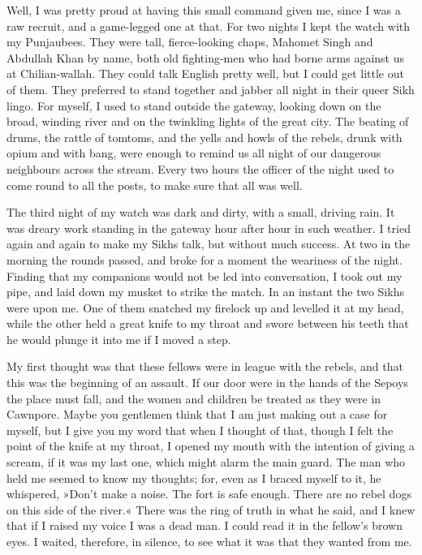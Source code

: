 Well, I was pretty proud at having this small command given me, since I was a raw recruit, and a game-legged one at that. For two nights I kept the watch with my Punjaubees. They were tall, fierce-looking chaps, Mahomet Singh and Abdullah Khan by name, both old fighting-men who had borne arms against us at Chilian-wallah. They could talk English pretty well, but I could get little out of them. They preferred to stand together and jabber all night in their queer Sikh lingo. For myself, I used to stand outside the gateway, looking down on the broad, winding river and on the twinkling lights of the great city. The beating of drums, the rattle of tomtoms, and the yells and howls of the rebels, drunk with opium and with bang, were enough to remind us all night of our dangerous neighbours across the stream. Every two hours the officer of the night used to come round to all the posts, to make sure that all was well.

The third night of my watch was dark and dirty, with a small, driving rain. It was dreary work standing in the gateway hour after hour in such weather. I tried again and again to make my Sikhs talk, but without much success. At two in the morning the rounds passed, and broke for a moment the weariness of the night. Finding that my companions would not be led into conversation, I took out my pipe, and laid down my musket to strike the match. In an instant the two Sikhs were upon me. One of them snatched my firelock up and levelled it at my head, while the other held a great knife to my throat and swore between his teeth that he would plunge it into me if I moved a step.

My first thought was that these fellows were in league with the rebels, and that this was the beginning of an assault. If our door were in the hands of the Sepoys the place must fall, and the women and children be treated as they were in Cawnpore. Maybe you gentlemen think that I am just making out a case for myself, but I give you my word that when I thought of that, though I felt the point of the knife at my throat, I opened my mouth with the intention of giving a scream, if it was my last one, which might alarm the main guard. The man who held me seemed to know my thoughts; for, even as I braced myself to it, he whispered, »Don't make a noise. The fort is safe enough. There are no rebel dogs on this side of the river.« There was the ring of truth in what he said, and I knew that if I raised my voice I was a dead man. I could read it in the fellow's brown eyes. I waited, therefore, in silence, to see what it was that they wanted from me.

